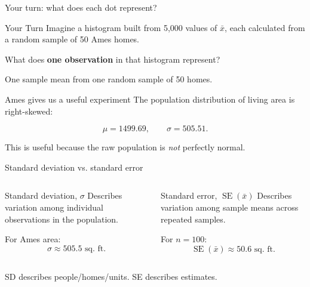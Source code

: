 \documentclass[11pt,aspectratio=169]{beamer}
\newcommand{\yourturn}[1]{%
\begin{center}
\begin{minipage}{0.90\textwidth}
\begin{alertblock}{Your Turn}
#1
\end{alertblock}
\end{minipage}
\end{center}}
\newcommand{\SE}{\operatorname{SE}}
\begin{document}
\begin{frame}{Your turn: what does each dot represent?}
\yourturn{Imagine a histogram built from 5,000 values of $\bar{x}$, each calculated from a random sample of 50 Ames homes.

What does \textbf{one observation} in that histogram represent?}

\vspace{1em}
\begin{center}
\Large One \alert{sample mean} from one random sample of 50 homes.
\end{center}
\end{frame}

\begin{frame}{Ames gives us a useful experiment}
The population distribution of living area is \alert{right-skewed}:

\begin{center}
\end{center}

\[
\mu=1499.69,\qquad \sigma=505.51.
\]

\vspace{0.15em}
This is useful because the raw population is \emph{not} perfectly normal.
\end{frame}

\begin{frame}{Standard deviation vs. standard error}
\begin{columns}[T,onlytextwidth]
\begin{block}{Standard deviation, $\sigma$}
Describes variation among \alert{individual observations} in the population.

For Ames area:
\[
\sigma\approx505.5\text{ sq. ft.}
\]
\end{block}
\begin{block}{Standard error, $\SE(\bar{x})$}
Describes variation among \alert{sample means} across repeated samples.

For $n=100$:
\[
\SE(\bar{x})\approx50.6\text{ sq. ft.}
\]
\end{block}
\end{columns}

\vfill
\alert{SD describes people/homes/units. SE describes estimates.}
\end{frame}
\end{document}
